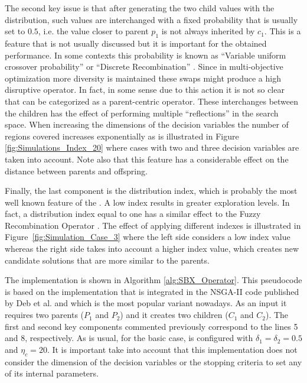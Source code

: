 The second key issue is that after generating the two child values with the \SBX{} distribution, such values
are interchanged with a fixed probability that is usually set to $0.5$, i.e. the value closer to parent $p_1$ is
not always inherited by $c_1$.
%
This is a feature that is not usually discussed but it is important for the obtained performance.
%
In some contexts this probability is known as ``Variable uniform crossover probability'' 
\cite{tuvsar2007differential} or ``Discrete Recombination'' \cite{muhlenbein1993predictive}.
%
Since in multi-objective optimization more diversity is maintained these swaps might produce a high disruptive operator.
%
In fact, in some sense due to this action it is not so clear that \SBX{} can be categorized as a parent-centric operator.
%
These interchanges between the children has the effect of performing multiple ``reflections'' in the search space.
%
When increasing the dimensions of the decision variables the number of regions covered increases exponentially 
as is illustrated in Figure \ref{fig:Simulations_Index_20} where cases with two and three decision variables are taken into account.
%
Note also that this feature has a considerable effect on the distance between parents and offspring.

Finally, the last component is the distribution index, which is probably the most well known feature of the \SBX{}.
%
A low index results in greater exploration levels.
%
In fact, a distribution index equal to one has a similar effect to the Fuzzy Recombination Operator \cite{voigt1995fuzzy}.
%
The effect of applying different indexes is illustrated in Figure~\ref{fig:Simulation_Case_3} where the left side
considers a low index value whereas the right side takes into account a higher index value, which creates 
new candidate solutions that are more similar to the parents.
%

The \SBX{} implementation is shown in Algorithm \ref{alg:SBX_Operator}.
%
This pseudocode is based on the implementation that is integrated in the NSGA-II code published by Deb et al. \cite{Joel:NSGAII} and which
is the most popular variant nowadays.
%
As an input it requires two parents ($P_1$ and $P_2$) and it creates two children ($C_1$ and $C_2$).
%
The first and second key components commented previously correspond to the lines 5 and 8, respectively. 
%
As is usual, for the basic case, \SBX{} is configured with $\delta_1 = \delta_2 = 0.5$ and $\eta_c = 20$.
%
It is important take into account that this implementation does not consider the dimension of the decision variables 
or the stopping criteria to set any of its internal parameters.

